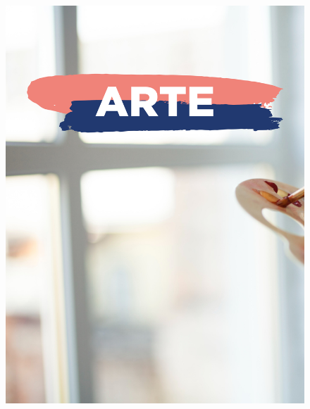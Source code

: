 \begin{figure}[htpb]
\vspace*{-2.5cm}
\hspace*{-2.5cm}\includegraphics[height=\paperheight]{../separadores/separadorART9A.png}
\end{figure}
\pagebreak
